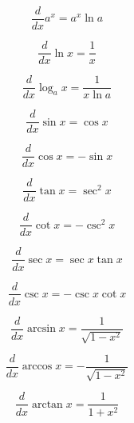 \documentclass{report}
\begin{document}
\begin{equation}
  \frac{d}{dx} a^x = a^x \ln a
  \label{eq:Derivative of a^x} 
\end{equation}

\begin{equation}
  \frac{d}{dx} \ln x = \frac{1}{x}
  \label{eq:Derivative of ln x} 
\end{equation}

\begin{equation}
  \frac{d}{dx} \log _a x = \frac{1}{x \ln a}
  \label{eq:Derivative of log_a x} 
\end{equation}

\begin{equation}
  \frac{d}{dx} \sin x = \cos x
  \label{eq:Derivative of sin x}
\end{equation}

\begin{equation}
  \frac{d}{dx} \cos x = -\sin x
  \label{eq:Derivative of cos x}
\end{equation}

\begin{equation}
  \frac{d}{dx} \tan x = \sec^2 x
  \label{eq:Derivative of tan x}
\end{equation}

\begin{equation}
  \frac{d}{dx} \cot x = -\csc^2 x
  \label{eq:Derivative of cot x}
\end{equation}

\begin{equation}
  \frac{d}{dx} \sec x = \sec x \tan x
  \label{eq:Derivative of sec x}
\end{equation}

\begin{equation}
  \frac{d}{dx} \csc x = -\csc x \cot x
  \label{eq:Derivative of csc x}
\end{equation}

\begin{equation}
  \frac{d}{dx} \arcsin x = \frac{1}{\sqrt{1-x^2}}
  \label{eq:Derivative of arcsin x}
\end{equation}

\begin{equation}
  \frac{d}{dx} \arccos x = -\frac{1}{\sqrt{1-x^2}}
  \label{eq:Derivative of arccos x}
\end{equation}

\begin{equation}
  \frac{d}{dx} \arctan x = \frac{1}{1+x^2}
  \label{eq:Derivative of arctan x}
\end{equation}
\end{document}
